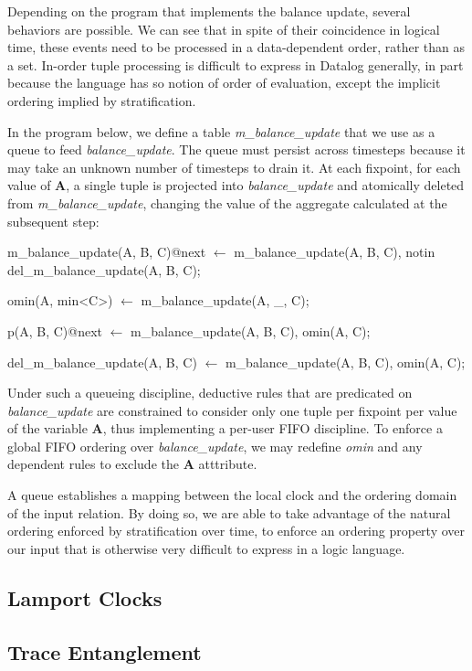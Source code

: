 Depending on the program that implements the balance update, several behaviors are possible.  We can see that in spite of their
coincidence in logical time, these events need to be processed in a data-dependent order, rather than as a set.  In-order tuple 
processing is difficult to express in Datalog generally, in part because the language has so notion of order of evaluation, except
the implicit ordering implied by stratification.

In the program below, we define a table \emph{m\_balance\_update} that we use as a queue to feed \emph{balance\_update}.  The queue must persist across
timesteps because it may take an unknown number of timesteps to drain it.  At each fixpoint, for each value of \textbf{A}, a single
tuple is projected into \emph{balance\_update} and atomically deleted from \emph{m\_balance\_update}, changing the value of the aggregate calculated at the
subsequent step:


\begin{Dedalus}

m\_balance\_update(A, B, C)@next \(\leftarrow\)
  m\_balance\_update(A, B, C),
  notin del\_m\_balance\_update(A, B, C);

omin(A, min<C>) \(\leftarrow\)
  m\_balance_update(A, _, C);

p(A, B, C)@next \(\leftarrow\)
  m\_balance\_update(A, B, C),
  omin(A, C);

del\_m\_balance\_update(A, B, C) \(\leftarrow\)
  m\_balance\_update(A, B, C),
  omin(A, C);
\end{Dedalus}

Under such a queueing discipline, deductive rules that are predicated on \emph{balance\_update} are constrained to consider only one tuple per fixpoint
per value of the variable \textbf{A}, thus implementing a per-user FIFO discipline.  To enforce a global FIFO ordering over \emph{balance\_update}, 
we may redefine \emph{omin} and any dependent rules to exclude the \textbf{A} atttribute.

A queue establishes a mapping between the local clock and the ordering domain of the input relation. By doing so, we are able to take
advantage of the natural ordering enforced by stratification over time, to enforce an ordering property over our input that is otherwise 
very difficult to express in a logic language.

\subsection{Lamport Clocks}


\subsection{Trace Entanglement}

